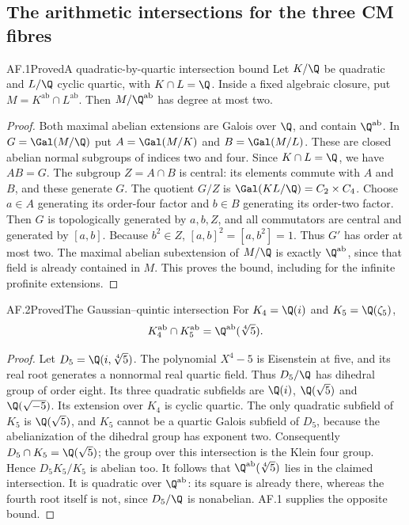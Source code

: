\subsection{The arithmetic intersections for the three CM fibres}

\begin{statement}{AF.1}{Proved}{A quadratic-by-quartic intersection bound}
Let $K/\Q$ be quadratic and $L/\Q$ cyclic quartic, with $K\cap L=\Q$.
Inside a fixed algebraic closure, put $M=K^{\mathrm{ab}}\cap L^{\mathrm{ab}}$.
Then $M/\Q^{\mathrm{ab}}$ has degree at most two.
\end{statement}
\begin{proof}
Both maximal abelian extensions are Galois over $\Q$, and contain
$\Q^{\mathrm{ab}}$. In $G=\Gal(M/\Q)$ put
$A=\Gal(M/K)$ and $B=\Gal(M/L)$. These are closed abelian normal
subgroups of indices two and four. Since $K\cap L=\Q$, we have
$AB=G$. The subgroup $Z=A\cap B$ is central: its elements commute
with $A$ and $B$, and these generate $G$. The quotient $G/Z$ is
$\Gal(KL/\Q)=C_2\times C_4$. Choose $a\in A$ generating its
order-four factor and $b\in B$ generating its order-two factor.
Then $G$ is topologically generated by $a,b,Z$, and all commutators
are central and generated by $[a,b]$. Because $b^2\in Z$,
$[a,b]^2=[a,b^2]=1$. Thus $G'$ has order at most two. The maximal
abelian subextension of $M/\Q$ is exactly $\Q^{\mathrm{ab}}$,
since that field is already contained in $M$. This proves the bound,
including for the infinite profinite extensions.
\end{proof}

\begin{statement}{AF.2}{Proved}{The Gaussian--quintic intersection}
For $K_4=\Q(i)$ and $K_5=\Q(\zeta_5)$,
\[
 K_4^{\mathrm{ab}}\cap K_5^{\mathrm{ab}}
       =\Q^{\mathrm{ab}}(\sqrt[4]{5}).
\]
\end{statement}
\begin{proof}
Let $D_5=\Q(i,\sqrt[4]{5})$. The polynomial $X^4-5$ is Eisenstein
at five, and its real root generates a nonnormal real quartic field.
Thus $D_5/\Q$ has dihedral group of order eight. Its three quadratic
subfields are $\Q(i)$, $\Q(\sqrt5)$ and $\Q(\sqrt{-5})$.
Its extension over $K_4$ is cyclic quartic. The only quadratic
subfield of $K_5$ is $\Q(\sqrt5)$, and $K_5$ cannot be a quartic
Galois subfield of $D_5$, because the abelianization of the dihedral
group has exponent two. Consequently
$D_5\cap K_5=\Q(\sqrt5)$; the group over this intersection is the
Klein four group. Hence $D_5K_5/K_5$ is abelian too.
It follows that $\Q^{\mathrm{ab}}(\sqrt[4]5)$ lies in the claimed
intersection. It is quadratic over $\Q^{\mathrm{ab}}$: its square
is already there, whereas the fourth root itself is not, since
$D_5/\Q$ is nonabelian. AF.1 supplies the opposite bound.
\end{proof}

